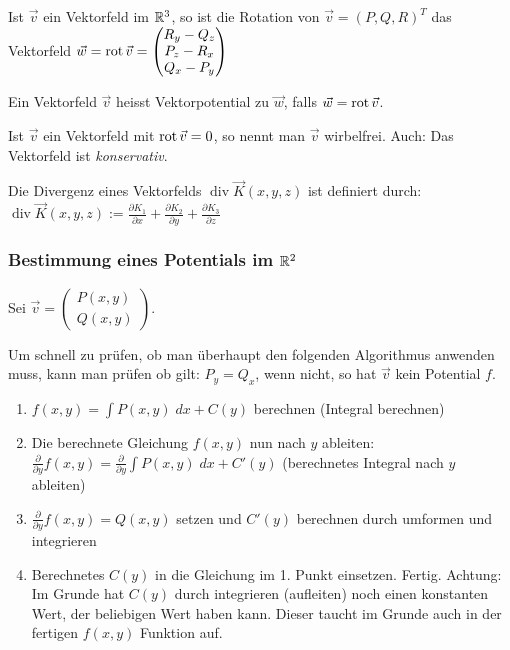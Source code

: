 \begin{definition}
Ist $\vec{v}$ ein Vektorfeld im $\mathbb{R}^3$, so ist die Rotation von $\vec{v} = (P, Q, R)^T$ das Vektorfeld
$\vec{w} = \operatorname{rot} \vec{v} = \begin{pmatrix}
R_y - Q_z\\
P_z - R_x\\
Q_x - P_y
\end{pmatrix}$
\end{definition}

\begin{definition}[Vektorpotential]
Ein Vektorfeld $\vec{v}$ heisst Vektorpotential zu $\vec{w}$, falls $\vec{w} = \operatorname{rot} \vec{v}$.
\end{definition}

\begin{definition}
Ist $\vec{v}$ ein Vektorfeld mit $\operatorname{rot} \vec{v} = 0$, so nennt man $\vec{v}$ wirbelfrei. Auch: Das Vektorfeld ist \emph{konservativ}.
\end{definition}

\begin{definition}[Divergenz]
Die Divergenz eines Vektorfelds $\operatorname{div} \vec{K}(x,y,z)$ ist definiert durch:
$\operatorname{div} \vec{K}(x,y,z) := \frac{\partial
K_1}{\partial x} + \frac{\partial K_2}{\partial y} + \frac{\partial
K_3}{\partial z}$
\end{definition}

\subsubsection{Bestimmung eines Potentials im $\mathbb{R}^2$}
Sei $\vec{v} = \begin{pmatrix}
P(x,y)\\
Q(x,y)
\end{pmatrix}$.

Um schnell zu prüfen, ob man überhaupt den folgenden Algorithmus anwenden muss,
kann man prüfen ob gilt: $P_y = Q_x$, wenn nicht, so hat $\vec{v}$ kein Potential $f$.

\begin{enumerate}[itemsep=1em]
	\item $f(x,y) = \int P(x,y)\;dx + C(y)$ berechnen (Integral berechnen)
	\item Die berechnete Gleichung $f(x,y)$ nun nach $y$ ableiten:
	$\frac{\partial}{\partial y} f(x,y) = \frac{\partial}{\partial y}\int P(x,y)\;dx + C'(y)$
	(berechnetes Integral nach $y$ ableiten)
	\item $\frac{\partial}{\partial y} f(x,y) = Q(x,y)$ setzen und $C'(y)$ berechnen durch umformen
	und integrieren
	\item Berechnetes $C(y)$ in die Gleichung im 1. Punkt einsetzen. Fertig. Achtung: Im Grunde hat
	$C(y)$ durch integrieren (aufleiten) noch einen konstanten Wert, der beliebigen Wert haben kann.
	Dieser taucht im Grunde auch in der fertigen $f(x,y)$ Funktion auf.
\end{enumerate}

